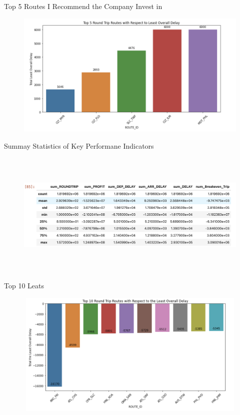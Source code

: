 \documentclass[aspectratio=1610]{beamer}
\begin{document}
\begin{frame}{Top 5 Routes I Recommend the Company Invest in}
	\begin{figure}[htp!]
		\begin{center}
			\includegraphics[height=6cm, width= 12cm]{Top5Recom} 
			\caption{}
			\label{Top5Recomended}
		\end{center}
	\end{figure}
\end{frame}

\begin{frame}{Summay Statistics of Key Performane Indicators}
	\begin{figure}[htp!]
		\begin{center}
			\includegraphics[height=6cm, width= 12cm]{SumStats} 
			\caption{}
			\label{SummaryStats}
		\end{center}
	\end{figure}
\end{frame}

\begin{frame}{Top 10 Leats}
	\begin{figure}[htp!]
		\begin{center}
			\includegraphics[height=6cm, width= 12cm]{LestDelayed} 
			\caption{}
			\label{LestDelaye}
		\end{center}
	\end{figure}
\end{frame}
\end{document}
